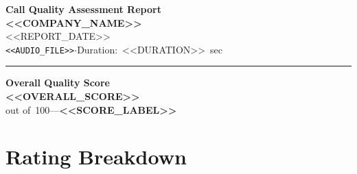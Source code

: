 \documentclass[12pt,a4paper]{article}
\begin{document}
\begin{center}
  {\fontsize{20}{26}\selectfont\textbf{\textcolor{accent}{Call Quality Assessment Report}}}\\[0.5em]
  {\large\textbf{<<COMPANY_NAME>>}}\\[0.25em]
  {\normalsize <<REPORT_DATE>>}\\[0.15em]
  {\small\texttt{<<AUDIO_FILE>>}\quad$\cdot$\quad Duration:~<<DURATION>>~sec}
\end{center}

\vspace{0.6em}
\noindent\textcolor{accent}{\rule{\textwidth}{1.2pt}}
\vspace{0.8em}

\begin{center}
  \colorbox{gray!10}{%
    \begin{minipage}{0.58\textwidth}
      \centering\vspace{0.7em}
      {\large\textbf{Overall Quality Score}}\\[0.5em]
      {\fontsize{54}{62}\selectfont\textcolor{<<SCORE_COLOR>>}{\textbf{<<OVERALL_SCORE>>}}}\\[0.2em]
      {\normalsize out of~100\quad---\quad\textbf{<<SCORE_LABEL>>}}\\[0.7em]
    \end{minipage}%
  }
\end{center}

\vspace{1.4em}

\section*{\textcolor{accent}{Rating Breakdown}}
\end{document}
